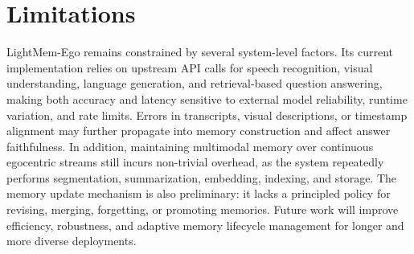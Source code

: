 \section*{Limitations}

LightMem-Ego remains constrained by several system-level factors. Its current implementation relies on upstream API calls for speech recognition, visual understanding, language generation, and retrieval-based question answering, making both accuracy and latency sensitive to external model reliability, runtime variation, and rate limits. 
Errors in transcripts, visual descriptions, or timestamp alignment may further propagate into memory construction and affect answer faithfulness. 
In addition, maintaining multimodal memory over continuous egocentric streams still incurs non-trivial overhead, as the system repeatedly performs segmentation, summarization, embedding, indexing, and storage.
The memory update mechanism is also preliminary: it lacks a principled policy for revising, merging, forgetting, or promoting memories. 
Future work will improve efficiency, robustness, and adaptive memory lifecycle management for longer and more diverse deployments.
